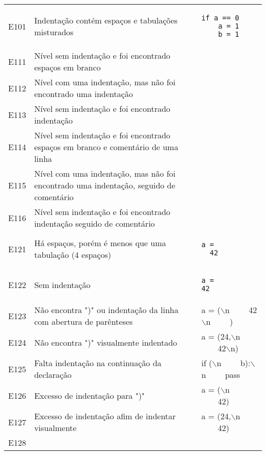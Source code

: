 \begin{table}
\begin{tabular}{|l|p{8cm}|p{6cm}|}
			\hline
			E101	& Indentação contém espaços e tabulações misturados	&
\begin{lstlisting}
if a == 0
    a = 1
	b = 1
\end{lstlisting}\\
			E111	& Nível sem indentação e foi encontrado espaços em branco &  \\
			\hline
			E112	& Nível com uma indentação, mas não foi encontrado uma indentação	&  \\
			\hline
			E113	& Nível sem indentação e foi encontrado indentação	&  \\
			\hline
			E114	& Nível sem indentação e foi encontrado espaços em branco e comentário de uma linha &  \\
			\hline
			E115	& Nível com uma indentação, mas não foi encontrado uma indentação, seguido de comentário &  \\
			\hline
			E116	& Nível sem indentação e foi encontrado indentação seguido de comentário &  \\
			\hline
			E121 	& Há espaços, porém é menos que uma tabulação (4 espaços) & 
\begin{lstlisting}
a =
  42
\end{lstlisting}\\
			\hline
			E122	& Sem indentação &
\begin{lstlisting}
a =
42
\end{lstlisting}\\			
			\hline
			E123 & Não encontra ")" ou indentação da linha com abertura de parênteses &
			a = ($\backslash$n \ \ \ \ 42$\backslash$n \ \ \ \ )\\
			\hline
			E124 & Não encontra ")" visualmente indentado & a = (24,$\backslash$n \ \ \ \  42$\backslash$n) \\
			\hline
			E125 & Falta indentação na continuação da declaração
			& if ($\backslash$n \ \ \ \ b):$\backslash$n \ \ \ \ pass \\
			\hline
			E126
			& Excesso de indentação para ")"
			& a = ($\backslash$n \ \ \ \ 42) \\
			\hline
			E127
			& Excesso de indentação afim de indentar visualmente
			& a = (24,$\backslash$n \ \ \ \   42) \\
			\hline
			E128

\end{tabular}
\end{table}
